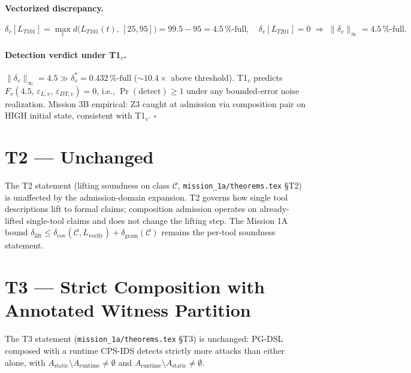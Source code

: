\documentclass[11pt]{article}
\begin{document}
\paragraph{Vectorized discrepancy.}
\[
\delta_v[L_{T101}] = \max_t d\bigl(L_{T101}(t),\, [25, 95]\bigr)
                   = 99.5 - 95
                   = 4.5\,\%\text{-full}, \quad
\delta_v[L_{T201}] = 0
\;\Rightarrow\;
\|\delta_v\|_\infty = 4.5\,\%\text{-full}.
\]

\paragraph{Detection verdict under T1${}_v$.}
$\|\delta_v\|_\infty = 4.5 \gg \delta^{*}_{v} = 0.432\,\%\text{-full}$
($\sim 10.4\times$ above threshold). T1${}_v$ predicts
$F_v(4.5,\,\varepsilon_{L,v},\,\varepsilon_{DT,v}) = 0$, i.e.,
$\Pr(\text{detect}) \geq 1$ under any bounded-error noise realization.
Mission 3B empirical: Z3 caught at admission via composition pair on HIGH
initial state, consistent with T1${}_v$. \hfill$\square$

\section{T2 --- Unchanged}

The T2 statement (lifting soundness on class $\mathcal{C}$,
\texttt{mission\_1a/theorems.tex} \S T2) is unaffected by the admission-domain
expansion. T2 governs how single tool descriptions lift to formal claims;
composition admission operates on already-lifted single-tool claims and does
not change the lifting step. The Mission 1A bound
$\delta_{\text{lift}} \leq \delta_{\text{cov}}(\mathcal{C}, L_{\text{verify}})
+ \delta_{\text{gram}}(\mathcal{C})$ remains the per-tool soundness statement.

\section{T3 --- Strict Composition with Annotated Witness Partition}
\label{sec:t3}

The T3 statement (\texttt{mission\_1a/theorems.tex} \S T3) is unchanged: PG-DSL
composed with a runtime CPS-IDS detects strictly more attacks than either
alone, with $A_{\text{static}} \setminus A_{\text{runtime}} \neq \emptyset$
and $A_{\text{runtime}} \setminus A_{\text{static}} \neq \emptyset$.
\end{document}
